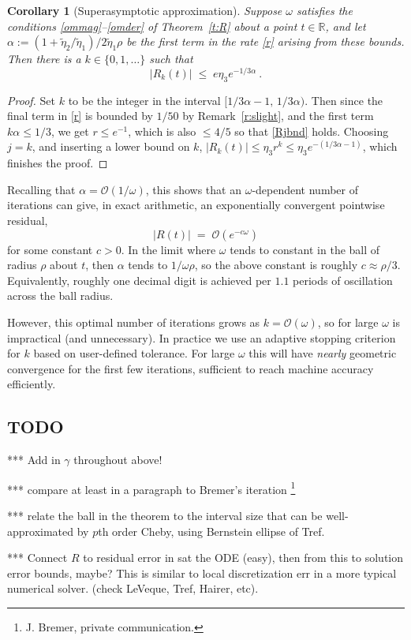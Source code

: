 \documentclass[10pt]{article}
\newcommand{\R}{\mathbb{R}}
\newcommand{\bigO}{{\mathcal O}}
\newtheorem{cor}[thm]{Corollary}
\newcommand{\om}{\omega}
\newcommand{\te}{\tilde\eta}
\begin{document}
\begin{cor}[Superasymptotic approximation]\label{super}
  Suppose $\om$ satisfies the conditions \eqref{ommag}--\eqref{omder}
  of Theorem~\ref{t:R}
  about a point $t\in\R$,
  and let $\alpha := (1+\te_2/\te_1)/2\te_1\rho$ be the
  first term in the rate \eqref{r} arising from these bounds.
  Then there is a $k\in\{0,1,\dots\}$ such that
  $$
  |R_k(t)| \; \le \; e \eta_3 e^{-1/3\alpha}~.
  $$
\end{cor}
\begin{proof}
  Set $k$ to be the integer in the interval $[1/3\alpha-1, \, 1/3\alpha)$.
    Then since the final term in \eqref{r} is bounded by $1/50$
    by Remark~\ref{r:slight}, and the
    first term $k\alpha \le 1/3$, we get $r\le e^{-1}$, which
    is also $\le 4/5$ so that \eqref{Rjbnd} holds.
    Choosing $j=k$, and inserting a lower bound on $k$,
    $|R_k(t)| \le \eta_3 r^k \le \eta_3 e^{-(1/3\alpha-1)}$, which
    finishes the proof.
  \end{proof}
Recalling that $\alpha = \bigO(1/\om)$, this
shows that an $\om$-dependent
number of iterations can give, in exact arithmetic, an
exponentially convergent pointwise residual,
$$
|R(t)| \;=\; \bigO(e^{-c\om})
$$
for some constant $c>0$.
In the limit where
$\om$ tends to constant in the ball of radius $\rho$ about $t$, then
$\alpha$ tends to $1/\om\rho$, so the above
constant is roughly $c\approx \rho/3$.
Equivalently, roughly one decimal digit is achieved per
$1.1$ periods of oscillation across the ball radius.

However, this optimal number of iterations grows as $k = \bigO(\om)$,
so for large $\om$ is impractical (and unnecessary).
In practice we use an adaptive stopping criterion for $k$ based
on user-defined tolerance.
For large $\om$ this will have \textit{nearly} geometric convergence
for the first few iterations, sufficient to reach
machine accuracy efficiently.





\subsection{TODO}

*** Add in $\gamma$ throughout above!

*** compare at least in a paragraph to Bremer's iteration
\footnote{J. Bremer, private communication.}

*** relate the ball in the theorem to the interval size that
can be well-approximated by $p$th order Cheby,
using Bernstein ellipse of Tref.


*** Connect $R$ to residual error in sat the ODE (easy),
then from this to solution error bounds, maybe?
This is similar to local discretization err
in a more typical numerical solver.
(check LeVeque, Tref, Hairer, etc).






\end{document}
